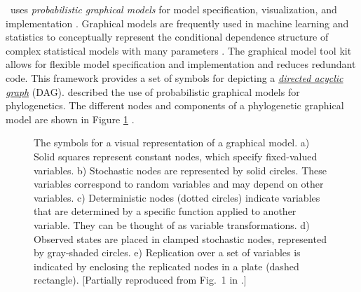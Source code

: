 \documentclass[11pt]{article}
\begin{document}
\RevBayes~uses \textit{probabilistic graphical models} for model specification, visualization, and implementation \citep{hoehnaGM2014}. 
Graphical models are frequently used in machine learning and statistics to conceptually represent the conditional dependence structure of complex statistical models with many parameters \citep{Gilks1994,lunn00,Jordan2004,Koller2009,Lunn2009}. 
The graphical model tool kit allows for flexible model specification and implementation and reduces redundant code. 
This framework provides a set of symbols for depicting a \href{http://en.wikipedia.org/wiki/Directed_acyclic_graph}{\textit{directed acyclic graph}} (DAG). 
\citet{hoehnaGM2014} described the use of probabilistic graphical models for phylogenetics. 
The different nodes and components of a phylogenetic graphical model are shown in Figure \ref{gmnotation} \citep[Fig. 1 from][]{hoehnaGM2014}. 
\begin{figure}[h!]
\centering
{}
\caption{\small The symbols for a visual representation of a graphical model. 
a) Solid squares represent constant nodes, which specify fixed-valued variables. 
b) Stochastic nodes are represented by solid circles. 
These variables correspond to random variables and may depend on other variables. 
c) Deterministic nodes (dotted circles) indicate variables that are determined by a specific function applied to another variable. 
They can be thought of as variable transformations. 
d) Observed states are placed in clamped stochastic nodes, represented by gray-shaded circles. e) Replication over a set of variables is indicated by enclosing the replicated nodes in a plate (dashed rectangle). 
[Partially reproduced from Fig.~1 in \citet{hoehnaGM2014}.]
}
\label{gmnotation}
\end{figure}
\end{document}
